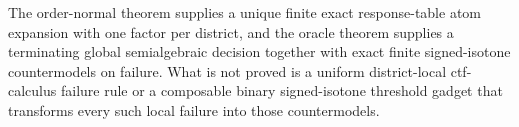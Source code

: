 The order-normal theorem supplies a unique finite exact response-table atom expansion with one factor per district, and the oracle theorem supplies a terminating global semialgebraic decision together with exact finite signed-isotone countermodels on failure.  What is not proved is a uniform district-local ctf-calculus failure rule or a composable binary signed-isotone threshold gadget that transforms every such local failure into those countermodels.